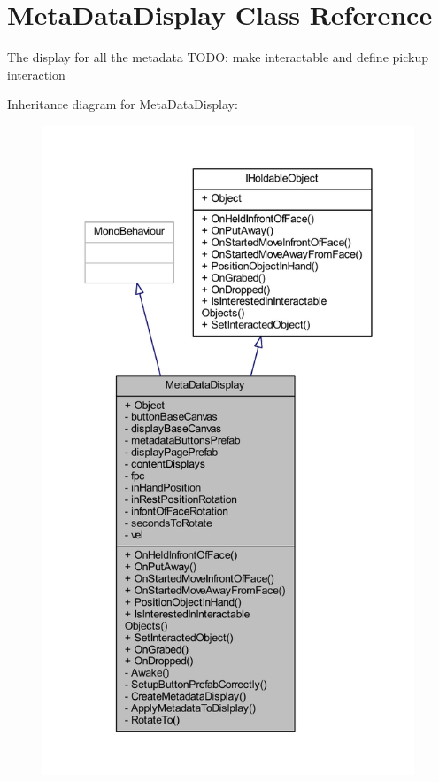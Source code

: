 \hypertarget{class_meta_data_display}{}\section{Meta\+Data\+Display Class Reference}
\label{class_meta_data_display}


The display for all the metadata T\+O\+DO\+: make interactable and define pickup interaction  




Inheritance diagram for Meta\+Data\+Display\+:
\nopagebreak
\begin{figure}[H]
\begin{center}
\leavevmode
\includegraphics[height=550pt]{class_meta_data_display__inherit__graph}
\end{center}
\end{figure}


